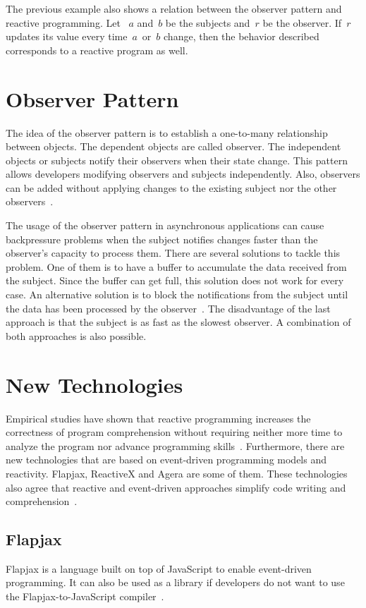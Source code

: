 \documentclass[type=bsc,accentcolor=tud9c]{tudthesis}
\newcommand{\framework}[1]{\textcolor{black!65}{#1}}
\begin{document}
The previous example also shows a relation between the observer pattern and reactive programming. Let ~$a$ and~$b$ be the subjects and~$r$ be the observer.  If~$r$ updates its value every time~$a$~or~$b$ change, then the behavior described corresponds to a reactive program as well.



\section{Observer Pattern}
The idea of the observer pattern is to establish a one-to-many relationship between objects. The dependent objects are called observer. The independent objects or subjects notify their observers when their state change. This pattern allows developers modifying observers and subjects independently. Also, observers can be added without applying changes to the existing subject nor the other observers~\cite{bookDesignPatterns}.

The usage of the observer pattern in asynchronous applications can cause backpressure problems when the subject notifies changes faster than the observer's capacity to process them. There are several solutions to tackle this problem. One of them is to have a buffer to accumulate the data received from the subject. Since the buffer can get full, this solution does not work for every case. An alternative solution is to block the notifications from the subject until the data has been processed by the observer~\cite{rxJavaBackpressure}. The disadvantage of the last approach is that the subject is as fast as the slowest observer. A combination of both approaches is also possible.

\section{New Technologies}
Empirical studies have shown that reactive programming increases the correctness of program comprehension without requiring neither more time to analyze the program nor advance programming skills~\cite{paperReactiveComprehension}. Furthermore, there are new technologies that are based on event-driven programming models and reactivity. \framework{Flapjax}, \framework{ReactiveX} and \framework{Agera} are some of them. These technologies also agree that reactive and event-driven approaches simplify code writing and comprehension~\cite{agera, reactiveX, paperFlapjax}.

\subsection{Flapjax}
\framework{Flapjax} is a language built on top of \framework{JavaScript} to enable event-driven programming. 
It can also be used as a library if developers do not want to use the Flapjax-to-JavaScript compiler~\cite{paperFlapjax}.
\end{document}
